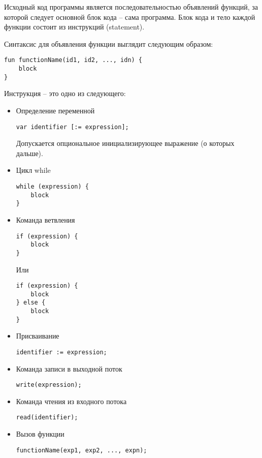 Исходный код программы является последовательностью объявлений функций, за
которой следует основной блок кода -- сама программа.
Блок кода и тело каждой функции состоит из инструкций (statement).

Синтаксис для объявления функции выглядит следующим образом:
\begin{lstlisting}
fun functionName(id1, id2, ..., idn) {
    block
}
\end{lstlisting}

Инструкция -- это одно из следующего:
\begin{itemize}
    \item Определение переменной
\begin{lstlisting}
var identifier [:= expression];
\end{lstlisting}
    Допускается опциональное инициализирующее выражение (о которых дальше).\\
    
    \item Цикл while
\begin{lstlisting}
while (expression) {
    block
}
\end{lstlisting}
    
    \item Команда ветвления
\begin{lstlisting}
if (expression) {
    block
}
\end{lstlisting}
    Или
\begin{lstlisting}
if (expression) {
    block
} else {
    block
}
\end{lstlisting}
    
    \item Присваивание
\begin{lstlisting}
identifier := expression;
\end{lstlisting}
    
    \item Команда записи в выходной поток
\begin{lstlisting}
write(expression);
\end{lstlisting}

    \item Команда чтения из входного потока
\begin{lstlisting}
read(identifier);
\end{lstlisting}

    \item Вызов функции
\begin{lstlisting}
functionName(exp1, exp2, ..., expn);
\end{lstlisting}
\end{itemize}


